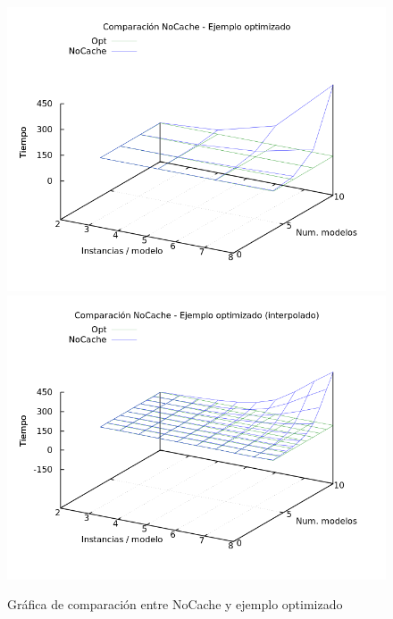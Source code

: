 \begin{figure}[H]
\centering
\includegraphics[scale=0.5]{img/comp-nc-opt}
\includegraphics[scale=0.5]{img/comp-nc-opt-spl}
\caption{Gráfica de comparación entre NoCache y ejemplo optimizado
\label{fig:grfcompall}}
\end{figure}






